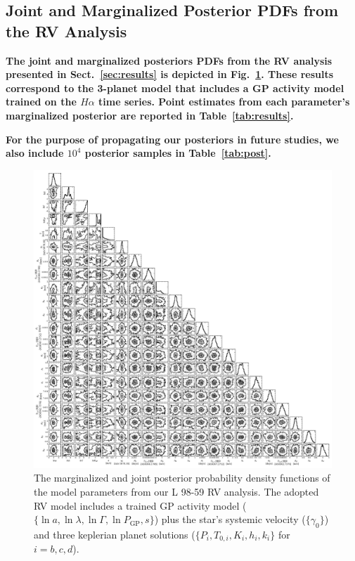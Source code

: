 \documentclass[longauth]{aa}
\begin{document}
\begin{appendix}
  \section{Joint and Marginalized Posterior PDFs from the RV Analysis} \label{app:corner}
  \textbf{The joint and marginalized posteriors PDFs from the RV analysis presented in Sect.~\ref{sec:results} is depicted in Fig.~\ref{fig:corner}. These results correspond to the 3-planet model that includes a GP activity model trained on the $H\alpha$ time series. Point estimates from each parameter's marginalized posterior are reported in Table~\ref{tab:results}.}

    \textbf{For the purpose of propagating our posteriors in future studies, we also include $10^4$ posterior samples in Table~\ref{tab:post}.}

    
  \begin{figure}
    \centering
    \includegraphics[width=.99\hsize]{corner.png}
    \caption{The marginalized and joint posterior probability density functions of the model parameters from our L 98-59 RV analysis. The adopted RV model includes a trained GP activity model ($\{ \ln{a}, \ln{\lambda}, \ln{\Gamma}, \ln{P_{\text{GP}}}, s \}$) plus the star's systemic velocity ($\{ \gamma_0 \}$) and three keplerian planet solutions ($\{ P_i, T_{0,i}, K_i, h_i, k_i \}$ for $i=b,c,d$).}
    \label{fig:corner}
  \end{figure}

  

\end{appendix}

%
%
\end{document}
